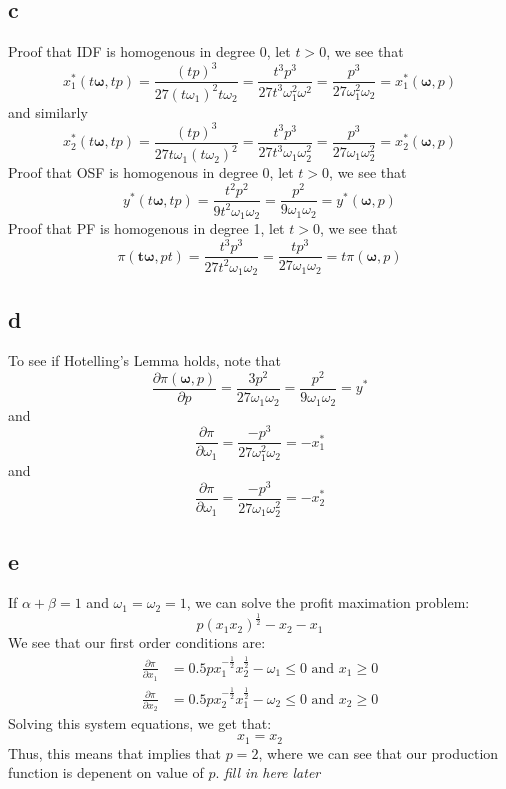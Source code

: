\documentclass[11pt]{article}
\begin{document}
\subsection*{c}
Proof that IDF is homogenous in degree 0, let $t >0$, we see that 
\[
x_1^*(t\mathbf{\omega}, tp) =\frac{(tp)^3}{27(t\omega_1)^2t\omega_2} = \frac{t^3 p^3}{27t^3\omega_1^2\omega^2} = \frac{p^3}{27\omega_1^2\omega_2} = x_1^*(\mathbf{\omega}, p)
\]
and similarly
\[
x_2^*(t\mathbf{\omega}, tp) = \frac{(tp)^3}{27t\omega_1(t\omega_2)^2} = \frac{t^3p^3}{27t^3\omega_1\omega_2^2} = \frac{p^3}{27\omega_1\omega_2^2} = x_2^*(\mathbf{\omega}, p)
\]
Proof that OSF is homogenous in degree 0, let $t > 0$, we see that 
\[
y^*(t\mathbf{\omega}, tp) = \frac{t^2p^2}{9t^2\omega_1\omega_2} = \frac{p^2}{9\omega_1\omega_2} = y^*(\mathbf{\omega}, p)
\]
Proof that PF is homogenous in degree 1, let $t > 0$, we see that 
\[
\pi(\mathbf{t\omega}, pt) = \frac{t^3p^3}{27t^2\omega_1\omega_2} = \frac{tp^3}{27\omega_1\omega_2} = t\pi(\mathbf{\omega}, p)
\]
\subsection*{d}
To see if Hotelling's Lemma holds, note that 
\[
\frac{\partial \pi(\mathbf{\omega}, p)}{\partial p} = \frac{3p^2}{27\omega_1\omega_2} = \frac{p^2}{9\omega_1\omega_2} = y^*
\]
and 
\[
\frac{\partial \pi}{\partial \omega_1} = \frac{-p^3}{27\omega_1^2\omega_2} = -x^*_1
\]
and 
\[
    \frac{\partial \pi}{\partial \omega_1} = \frac{-p^3}{27 \omega_1\omega_2^2} = -x^*_2
\]
\subsection*{e}

If $\alpha + \beta = 1$ and $\omega_1 = \omega_2 = 1$, we can solve the profit maximation problem:
\[
p(x_1x_2)^\frac{1}{2} - x_2 - x_1
\]
We see that our first order conditions are:
\begin{align*}
    \frac{\partial \pi}{\partial x_1} &= 0.5p x^{-\frac{1}{2}}_1 x_2^\frac{1}{2} - \omega_1 \leq 0 \text{ and } x_1 \geq 0 \\
    \frac{\partial \pi}{\partial x_2} &= 0.5 p x_2^{-\frac{1}{2}} x_1^\frac{1}{2} - \omega_2 \leq 0 \text{ and } x_2 \geq 0
\end{align*}
Solving this system equations, we get that:
\[
x_1 = x_2
\]
Thus, this means that implies that $p = 2$, where we can see that our production function is depenent on value of $p$. \emph{fill in here later}
\end{document}
